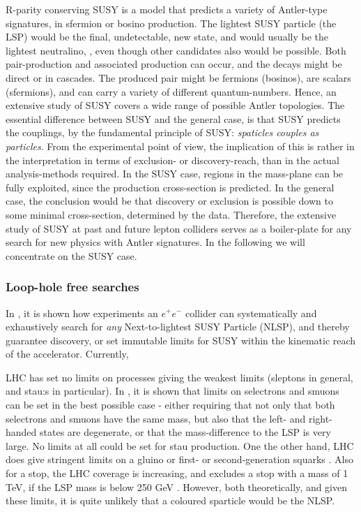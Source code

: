 R-parity conserving SUSY is a model that predicts a variety of
Antler-type signatures, 
in sfermion or bosino production.
The lightest SUSY particle (the LSP) would be the final,
undetectable, new state, and would usually be the lightest
neutralino, , even though other candidates also
would be possible.
Both pair-production and associated production can occur,
and the decays might be direct or in cascades.
The produced pair might be fermions (bosinos),
are scalars (sfermions),
and can carry a variety of different quantum-numbers.
Hence,
an extensive study of SUSY covers a wide range of possible
Antler topologies.
The essential difference between SUSY and the general case,
is that SUSY predicts the couplings, 
by the fundamental principle of SUSY:
{\it spaticles couples as particles}.
From the experimental point of view,
the implication of this is rather in the interpretation in terms
of exclusion- or discovery-reach,
than in the actual analysis-methods required.
In the SUSY case, 
regions in the mass-plane can be fully exploited, 
since the production cross-section is predicted.
In the general case,
the conclusion would be that discovery or exclusion is
possible down to some minimal cross-section,
determined by the data.
Therefore,
the extensive study of SUSY at past and future lepton colliders
serves as a boiler-plate for any search for new physics with
Antler signatures.
In the following we will concentrate on the SUSY case.


\subsubsection{Loop-hole free searches}
\label{subsec:searches_noloophole}
In \cite{Berggren:2013vna},
it is shown how experiments an $e^+e^-$ collider can systematically and exhaustively
search for {\it any} Next-to-lightest SUSY Particle (NLSP), and thereby guarantee discovery, 
or set immutable limits for SUSY within the kinematic reach of the accelerator.
Currently,

LHC has set no limits on processes giving the weakest limits
(sleptons in general, and stau:s in particular).
In \cite{Aaboud:2017leg,Aad:2014vma,Sirunyan:2018nwe},
it is shown that limits on selectrons and smuons can be set in the best possible case 
- either requiring that not only that both selectrons and smuons 
have the same mass, but also that the left- and right-handed states
are degenerate, or that the mass-difference to the LSP is very large.
No limits at all could be set for stau production.
One the other hand,
LHC does give stringent limits on a gluino or first- or second-generation
squarks \cite{Aaboud:2017vwy,*Sirunyan:2018vjp}.
Also for a stop,
the LHC coverage is increasing,
and excludes a stop with a mass of 1 TeV, 
if the LSP mass is below 250 GeV \cite{Aaboud:2017ayj,*Sirunyan:2018vjp}.
However,
both theoretically, and given these limits,
it is quite unlikely that a coloured sparticle would be the NLSP.

